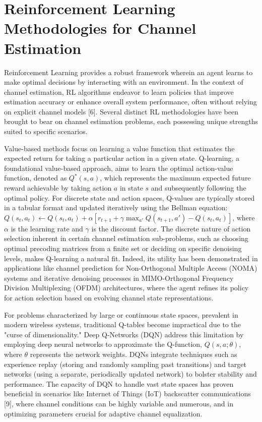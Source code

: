 \documentclass[journal,twocolumn]{IEEEtran}
\begin{document}
\section{Reinforcement Learning Methodologies for Channel Estimation}

Reinforcement Learning provides a robust framework wherein an agent learns to make optimal decisions by interacting with an environment. In the context of channel estimation, RL algorithms endeavor to learn policies that improve estimation accuracy or enhance overall system performance, often without relying on explicit channel models [6]. Several distinct RL methodologies have been brought to bear on channel estimation problems, each possessing unique strengths suited to specific scenarios.

Value-based methods focus on learning a value function that estimates the expected return for taking a particular action in a given state. Q-learning, a foundational value-based approach, aims to learn the optimal action-value function, denoted as $Q^*(s, a)$, which represents the maximum expected future reward achievable by taking action $a$ in state $s$ and subsequently following the optimal policy. For discrete state and action spaces, Q-values are typically stored in a tabular format and updated iteratively using the Bellman equation: $Q(s_t, a_t) \leftarrow Q(s_t, a_t) + \alpha [r_{t+1} + \gamma \max_{a'} Q(s_{t+1}, a') - Q(s_t, a_t)]$, where $\alpha$ is the learning rate and $\gamma$ is the discount factor. The discrete nature of action selection inherent in certain channel estimation sub-problems, such as choosing optimal precoding matrices from a finite set or deciding on specific denoising levels, makes Q-learning a natural fit. Indeed, its utility has been demonstrated in applications like channel prediction for Non-Orthogonal Multiple Access (NOMA) systems and iterative denoising processes in MIMO-Orthogonal Frequency Division Multiplexing (OFDM) architectures, where the agent refines its policy for action selection based on evolving channel state representations.

For problems characterized by large or continuous state spaces, prevalent in modern wireless systems, traditional Q-tables become impractical due to the "curse of dimensionality." Deep Q-Networks (DQN) address this limitation by employing deep neural networks to approximate the Q-function, $Q(s, a; \theta)$, where $\theta$ represents the network weights. DQNs integrate techniques such as experience replay (storing and randomly sampling past transitions) and target networks (using a separate, periodically updated network) to bolster stability and performance. The capacity of DQN to handle vast state spaces has proven beneficial in scenarios like Internet of Things (IoT) backscatter communications [9], where channel conditions can be highly variable and numerous, and in optimizing parameters crucial for adaptive channel equalization.
\end{document}
